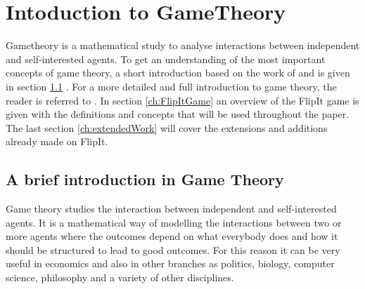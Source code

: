 \chapter{Intoduction to GameTheory}
\label{cha:1}
%


Gametheory is a mathematical study to analyse interactions between independent and self-interested agents. To get an understanding of the most important concepts of game theory, a short introduction based on the work of 
\cite{leyton2008essentials} and \cite{Coursera} is given in section \ref{Cha:1:Intro.Game.Theory}  . For a more detailed and full introduction to game theory, the reader is referred to 
\cite{leyton2008essentials}.  In section \ref{ch:FlipItGame} an overview of the FlipIt game is given with the definitions and concepts that will be used throughout the paper. 
The last section \ref{ch:extendedWork} will cover the extensions and additions already made on FlipIt.

\section{A brief introduction in Game Theory}
\label{Cha:1:Intro.Game.Theory}




Game theory studies the interaction between independent and self-interested agents. It is a mathematical way of modelling the interactions between two or more agents where the outcomes depend on what everybody does and how it should be structured to lead to good outcomes. For this reason it can be very useful in economics and also in other branches as politics, biology, computer science, philosophy and a variety of other disciplines.  \\

